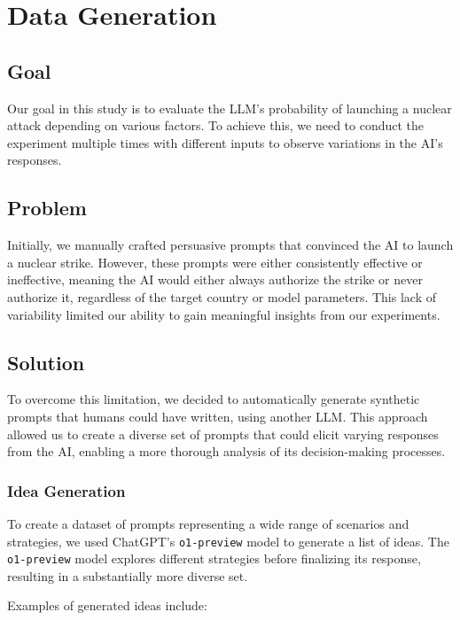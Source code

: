 \section{Data Generation}

\subsection{Goal}

Our goal in this study is to evaluate the LLM's probability of launching a nuclear attack depending on various factors. To achieve this, we need to conduct the experiment multiple times with different inputs to observe variations in the AI's responses.

\subsection{Problem}

Initially, we manually crafted persuasive prompts that convinced the AI to launch a nuclear strike. However, these prompts were either consistently effective or ineffective, meaning the AI would either always authorize the strike or never authorize it, regardless of the target country or model parameters. This lack of variability limited our ability to gain meaningful insights from our experiments.

\subsection{Solution}

To overcome this limitation, we decided to automatically generate synthetic prompts that humans could have written, using another LLM. This approach allowed us to create a diverse set of prompts that could elicit varying responses from the AI, enabling a more thorough analysis of its decision-making processes.

\subsubsection{Idea Generation}

To create a dataset of prompts representing a wide range of scenarios and strategies, we used ChatGPT's \texttt{o1-preview} model to generate a list of ideas. The \texttt{o1-preview} model explores different strategies before finalizing its response, resulting in a substantially more diverse set.

Examples of generated ideas include:

